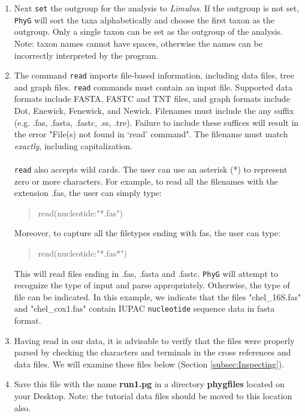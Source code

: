 \documentclass[11pt]{article}
\newcommand{\phyg}{\texttt{PhyG} }
\begin{document}
\begin{enumerate}
\item Next \texttt{set} the outgroup for the analysis to \textit{Limulus}. If the outgroup
is not set, \phyg will sort the taxa alphabetically and choose the first taxon as the
outgroup. Only a single taxon can be set as the outgroup of the analysis. Note: taxon 
names cannot have spaces, otherwise the names can be incorrectly interpreted by
the program.

\item The command \texttt{read} imports file-based information, including data files, 
tree and graph files. \texttt{read} commands must contain an input file. Supported 
data formats include FASTA, FASTC and TNT files, and graph formats include Dot, 
Enewick, Fenewick, and Newick. Filenames must include the any suffix (e.g. 
.fas, .fasta, .fastc, .ss, .tre). Failure to include these suffices will result in the error 
"File(s) not found in `read' command". The filename must match \textit{exactly}, 
including capitalization.\\
\\
\texttt{read} also accepts wild cards. The user can use an asterisk (*) to represent 
zero or more characters. For example, to read all the filenames with the extension .fas, 
the user can simply type:
        
        \begin{quote}
	read(nucleotide:"*.fas")\\
	\end{quote}
	
Moreover, to capture all the filetypes ending with fas, the user can type: 
	
	\begin{quote}
	read(nucleotide:"*.fas*")\\
	\end{quote}

This will read files ending in .fas, .fasta and .fastc. \phyg will attempt to recognize 
the type of input and parse appropriately. Otherwise, the type of file can be 
indicated. In this example, we indicate that the files "chel\_16S.fas" and 
"chel\_cox1.fas" contain IUPAC \texttt{nucleotide} sequence data in fasta format.

\item Having read in our data, it is advisable to verify that the files were properly 
parsed by checking the characters and terminals in the cross references and data 
files. We will examine these files below (Section \ref{subsec:Inspecting}).

\item Save this file with the name \textbf{run1.pg} in a directory \textbf{phygfiles} 
located on your Desktop. Note: the tutorial data files should be moved to this 
location also.

\end{enumerate}
\end{document}
